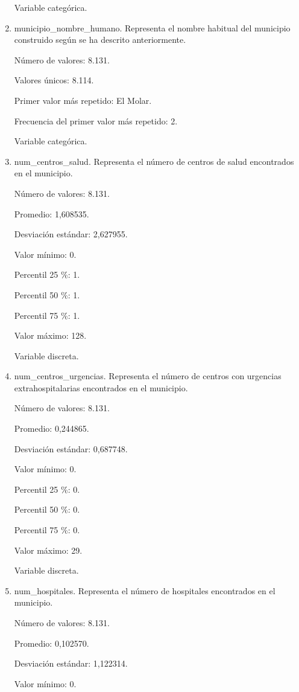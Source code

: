 \begin{enumerate}
	Variable categórica.

	\item municipio\_nombre\_humano. Representa el nombre habitual del municipio construido según se ha descrito anteriormente.
	
	Número de valores: 8.131.
	
	Valores únicos: 8.114.
	
	Primer valor más repetido: El Molar.
	
	Frecuencia del primer valor más repetido: 2.
	
	Variable categórica.

	\item num\_centros\_salud. Representa el número de centros de salud encontrados en el municipio.
	
	Número de valores: 8.131.
	
	Promedio: 1,608535.
	
	Desviación estándar: 2,627955.
	
	Valor mínimo: 0.
	
	Percentil 25 \%: 1.
	
	Percentil 50 \%: 1.
	
	Percentil 75 \%: 1.
	
	Valor máximo: 128.
	
	Variable discreta.

	\item num\_centros\_urgencias. Representa el número de centros con urgencias extrahospitalarias encontrados en el municipio.
	
	Número de valores: 8.131.
	
	Promedio: 0,244865.
	
	Desviación estándar: 0,687748.
	
	Valor mínimo: 0.
	
	Percentil 25 \%: 0.
	
	Percentil 50 \%: 0.
	
	Percentil 75 \%: 0.
	
	Valor máximo: 29.
	
	Variable discreta.

	\item num\_hospitales. Representa el número de hospitales encontrados en el municipio.
	
	Número de valores: 8.131.
	
	Promedio: 0,102570.
	
	Desviación estándar: 1,122314.
	
	Valor mínimo: 0.
	

\end{enumerate}
